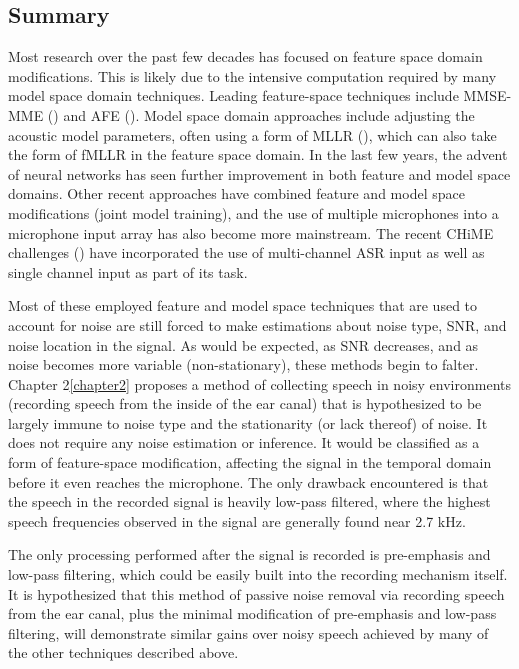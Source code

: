 \documentclass[dissertation,copyright]{uathesis}
\begin{document}
\subsection{Summary}

Most research over the past few decades has focused on feature space domain modifications.  This is likely due to the intensive computation required by many model space domain techniques.  Leading feature-space techniques include MMSE-MME (\cite{paliwal:12}) and AFE (\cite{etsi:02}). %
Model space domain approaches include adjusting the acoustic model parameters, often using a form of MLLR (\cite{leggetter:95}), which can also take the form of fMLLR in the feature space domain.  In the last few years, the advent of neural networks has seen further improvement in both feature and model space domains.  Other recent approaches have combined feature and model space modifications (joint model training), and the use of multiple microphones into a microphone input array has also become more mainstream. The recent CHiME challenges (\cite{chime:16}) have incorporated the use of multi-channel ASR input as well as single channel input as part of its task.

Most of these employed feature and model space techniques that are used to account for noise are still forced to make estimations about noise type, SNR, and noise location in the signal.  As would be expected, as SNR decreases, and as noise becomes more variable (non-stationary), these methods begin to falter.  Chapter 2\ref{chapter2} proposes a method of collecting speech in noisy environments (recording speech from the inside of the ear canal) that is hypothesized to be largely immune to noise type and the stationarity (or lack thereof) of noise.  It does not require any noise estimation or inference.  It would be classified as a form of feature-space modification, affecting the signal in the temporal domain before it even reaches the microphone.  The only drawback encountered is that the speech in the recorded signal is heavily low-pass filtered, where the highest speech frequencies observed in the signal are generally found near 2.7 kHz.

The only processing performed after the signal is recorded is pre-emphasis and low-pass filtering, which could be easily built into the recording mechanism itself.  It is hypothesized that this method of passive noise removal via recording speech from the ear canal, plus the minimal modification of pre-emphasis and low-pass filtering, will demonstrate similar gains over noisy speech achieved by many of the other techniques described above.
\end{document}
